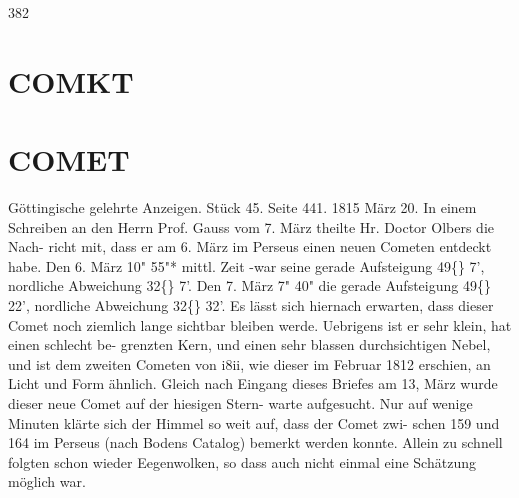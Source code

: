 \documentclass[12pt,a4paper]{article}
\newcommand{\degree}{\textdegree}
\begin{document}
\newpage
382 

\section*{COMKT}

\section*{COMET}
Göttingische  gelehrte  Anzeigen.     Stück  45.     Seite  441.     1815  März  20. 
In  einem  Schreiben  an  den  Herrn  Prof.  Gauss  vom  7.  März  theilte  Hr.  Doctor  Olbers  die  Nach- 
richt mit,  dass  er  am  6.  März  im  Perseus  einen  neuen  Cometen  entdeckt  habe.  Den  6.  März  10"  55"* 
mittl.  Zeit  -war  seine  gerade  Aufsteigung  49\degree\{\}  7',  nordliche  Abweichung  32\degree\{\}  7'.  Den  7.  März  7"  40"  die 
gerade  Aufsteigung  49\degree\{\}  22',  nordliche  Abweichung  32\degree\{\}  32'.  Es  lässt  sich  hiernach  erwarten,  dass  dieser 
Comet  noch  ziemlich  lange  sichtbar  bleiben  werde.  Uebrigens  ist  er  sehr  klein,  hat  einen  schlecht  be- 
grenzten Kern,  und  einen  sehr  blassen  durchsichtigen  Nebel,  und  ist  dem  zweiten  Cometen  von  i8ii, 
wie   dieser  im  Februar  1812  erschien,  an  Licht  und  Form  ähnlich. 
Gleich  nach  Eingang  dieses  Briefes  am  13,  März  wurde  dieser  neue  Comet  auf  der  hiesigen  Stern- 
warte aufgesucht.  Nur  auf  wenige  Minuten  klärte  sich  der  Himmel  so  weit  auf,  dass  der  Comet  zwi- 
schen 159  und  164  im  Perseus  (nach  Bodens  Catalog)  bemerkt  werden  konnte.  Allein  zu  schnell  folgten 
schon  wieder  Eegenwolken,  so  dass  auch  nicht  einmal  eine  Schätzung  möglich  war. 
\end{document}
